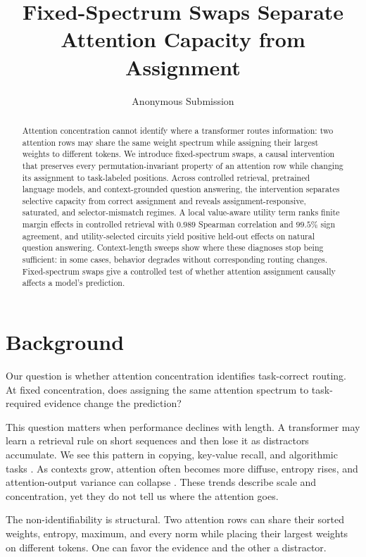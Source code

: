 \documentclass[letterpaper]{article} %
\title{Fixed-Spectrum Swaps Separate Attention Capacity from Assignment}
\author{Anonymous Submission}
\begin{document}
\setcounter{secnumdepth}{2}
\maketitle

\begin{abstract}
Attention concentration cannot identify where a transformer routes information: two attention rows may share
the same weight spectrum while assigning their largest weights to different tokens. We introduce
fixed-spectrum swaps, a causal intervention that preserves every permutation-invariant property of an attention
row while changing its assignment to task-labeled positions. Across controlled retrieval, pretrained language
models, and context-grounded question answering, the intervention separates selective capacity from correct
assignment and reveals assignment-responsive, saturated, and selector-mismatch regimes. A local value-aware
utility term ranks finite margin effects in controlled retrieval with $0.989$ Spearman correlation and $99.5\%$
sign agreement, and utility-selected circuits yield positive held-out effects on natural question answering.
Context-length sweeps show where these diagnoses stop being sufficient: in some cases, behavior degrades
without corresponding routing changes. Fixed-spectrum swaps give a controlled test of whether attention
assignment causally affects a model's prediction.
\end{abstract}

\section{Background}

Our question is whether attention concentration identifies task-correct routing. At fixed concentration, does
assigning the same attention spectrum to task-required evidence change the prediction?

This question matters when performance declines with length. A transformer may learn a retrieval rule on short
sequences and then lose it as distractors accumulate. We see this pattern in copying, key-value recall, and algorithmic tasks
\citep{kazemnejad,nopeentropy,sparselong}. As contexts grow, attention often becomes more diffuse, entropy rises,
and attention-output variance can collapse \citep{vanishingvariance}. These trends describe scale and
concentration, yet they do not tell us where the attention goes.

The non-identifiability is structural. Two attention rows can share their sorted weights, entropy, maximum, and
every norm while placing their largest weights on different tokens. One can favor the evidence and the other a
distractor.
\end{document}
